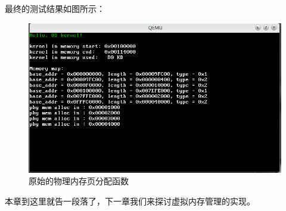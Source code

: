 \par 最终的测试结果如图所示：

\begin{figure}[H]
      \centering
      \includegraphics[scale=0.6]{picture/chapt9/PHY_MEM_ALLOC.png}
      \caption{原始的物理内存页分配函数}
\end{figure}

\par 本章到这里就告一段落了，下一章我们来探讨虚拟内存管理的实现。

